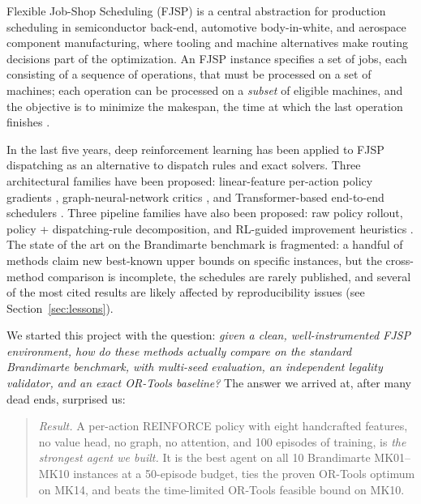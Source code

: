 \documentclass[preprint,review,3p,times,twocolumn]{elsarticle}
\begin{document}
Flexible Job-Shop Scheduling (FJSP) is a central abstraction
for production scheduling in semiconductor back-end, automotive
body-in-white, and aerospace component manufacturing, where
tooling and machine alternatives make routing decisions part
of the optimization. An FJSP instance specifies a set of jobs,
each consisting of a sequence of operations, that must be
processed on a set of machines; each operation can be
processed on a \emph{subset} of eligible machines, and the
objective is to minimize the makespan, the time at which the
last operation finishes \citep{Jain2016, Zhang2018}.

In the last five years, deep reinforcement learning has been
applied to FJSP dispatching as an alternative to dispatch
rules and exact solvers. Three architectural families have
been proposed: linear-feature per-action policy gradients
\citep{Williams1992, Zhang2020L2D}, graph-neural-network
critics \citep{Lei2022, Wang2022DAN, Song2022TII}, and
Transformer-based end-to-end schedulers
\citep{Park2021, Xiao2026RESCHED}. Three pipeline families
have also been proposed: raw policy rollout, policy +
dispatching-rule decomposition, and RL-guided improvement
heuristics \citep{Zhang2024L2I, Hottung2022}. The state of
the art on the Brandimarte benchmark is fragmented: a
handful of methods claim new best-known upper bounds on
specific instances, but the cross-method comparison is
incomplete, the schedules are rarely published, and several
of the most cited results are likely affected by
reproducibility issues (see Section~\ref{sec:lessons}).

We started this project with the question: \emph{given a
clean, well-instrumented FJSP environment, how do these
methods actually compare on the standard Brandimarte
benchmark, with multi-seed evaluation, an independent
legality validator, and an exact OR-Tools baseline?} The
answer we arrived at, after many dead ends, surprised us:

\begin{quote}
\emph{Result.} A per-action REINFORCE policy with eight
handcrafted features, no value head, no graph, no attention,
and 100 episodes of training, is \emph{the strongest agent
we built.} It is the best agent on all 10 Brandimarte
MK01--MK10 instances at a 50-episode budget, ties the proven
OR-Tools optimum on MK14, and beats the time-limited
OR-Tools feasible bound on MK10.
\end{quote}
\end{document}
